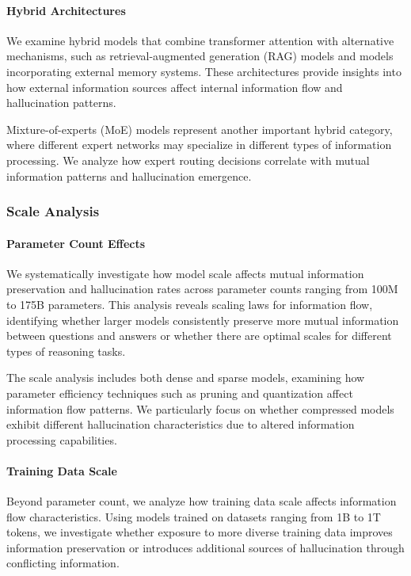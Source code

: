\paragraph{Hybrid Architectures}
We examine hybrid models that combine transformer attention with alternative mechanisms, such as retrieval-augmented generation (RAG) models and models incorporating external memory systems. These architectures provide insights into how external information sources affect internal information flow and hallucination patterns.

Mixture-of-experts (MoE) models represent another important hybrid category, where different expert networks may specialize in different types of information processing. We analyze how expert routing decisions correlate with mutual information patterns and hallucination emergence.

\subsubsection{Scale Analysis}

\paragraph{Parameter Count Effects}
We systematically investigate how model scale affects mutual information preservation and hallucination rates across parameter counts ranging from 100M to 175B parameters. This analysis reveals scaling laws for information flow, identifying whether larger models consistently preserve more mutual information between questions and answers or whether there are optimal scales for different types of reasoning tasks.

The scale analysis includes both dense and sparse models, examining how parameter efficiency techniques such as pruning and quantization affect information flow patterns. We particularly focus on whether compressed models exhibit different hallucination characteristics due to altered information processing capabilities.

\paragraph{Training Data Scale}
Beyond parameter count, we analyze how training data scale affects information flow characteristics. Using models trained on datasets ranging from 1B to 1T tokens, we investigate whether exposure to more diverse training data improves information preservation or introduces additional sources of hallucination through conflicting information.

